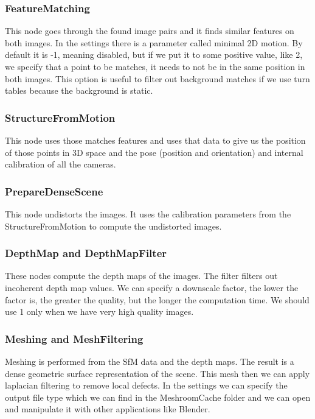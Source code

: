 \subsubsection{FeatureMatching}
    This node goes through the found image pairs and it finds similar features on both images. In the settings there is a parameter called minimal 2D motion. By default it is -1, meaning disabled, but if we put it to some positive value, like 2, we specify that a point to be matches, it needs to not be in the same position in both images. This option is useful to filter out background matches if we use turn tables because the background is static.

\subsubsection{StructureFromMotion}
    This node uses those matches features and uses that data to give us the position of those points in 3D space and the pose (position and orientation) and internal calibration of all the cameras. 

\subsubsection{PrepareDenseScene}
    This node undistorts the images. It uses the calibration parameters from the StructureFromMotion to compute the undistorted images. 

\subsubsection{DepthMap and DepthMapFilter}
    These nodes compute the depth maps of the images. The filter filters out incoherent depth map values. We can specify a downscale factor, the lower the factor is, the greater the quality, but the longer the computation time. We should use 1 only when we have very high quality images. 

\subsubsection{Meshing and MeshFiltering}
    Meshing is performed from the SfM data and the depth maps. The result is a dense geometric surface representation of the scene. This mesh then we can apply laplacian filtering to remove local defects. In the settings we can specify the output file type which we can find in the MeshroomCache folder and we can open and manipulate it with other applications like Blender.

